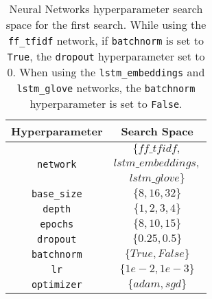\begin{table}[H]
    \centering
    \begin{tabular}{|c|c|}
        \hline

        \textbf{Hyperparameter} &
        \textbf{Search Space} \\

        \hline

        \multirow{3}{*}{\texttt{network}} &
        $\{ff\_tfidf,$ \\ 
        & $lstm\_embeddings,$ \\
        & $lstm\_glove\}$ \\

        \hline

        \texttt{base\_size} &
        $\{8, 16, 32\}$ \\

        \hline

        \texttt{depth} &
        $\{1, 2, 3, 4\}$ \\

        \hline

        \texttt{epochs} &
        $\{8, 10, 15\}$ \\

        \hline

        \texttt{dropout} &
        $\{0.25, 0.5\}$ \\

        \hline

        \texttt{batchnorm} &
        $\{True, False\}$ \\

        \hline

        \texttt{lr} &
        $\{1e-2, 1e-3\}$ \\

        \hline

        \texttt{optimizer} &
        $\{adam, sgd\}$ \\

        \hline
    \end{tabular}
    \caption{Neural Networks hyperparameter 
    search space for the first search. 
    While using the 
    \texttt{ff\_tfidf} network, if 
    \texttt{batchnorm} is set to \texttt{True},
    the \texttt{dropout} hyperparameter set to
    $0$. When using the 
    \texttt{lstm\_embeddings} and 
    \texttt{lstm\_glove} networks, the
    \texttt{batchnorm} hyperparameter is
    set to \texttt{False}.}
    \label{tab:nn_search_spaces_1}
\end{table}

